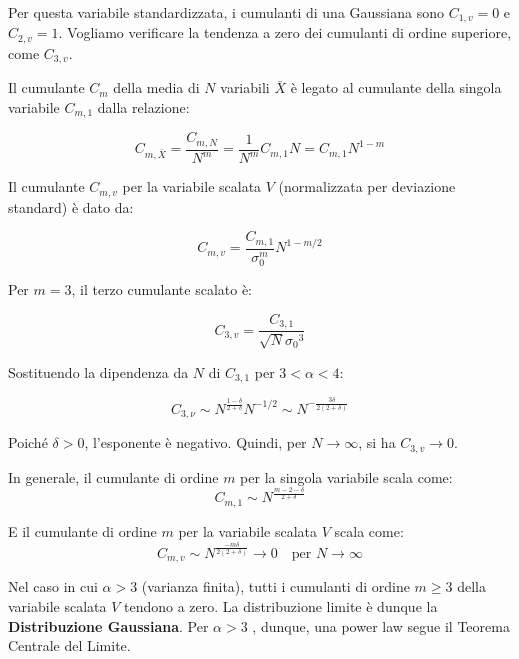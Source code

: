 Per questa variabile standardizzata, i cumulanti di una Gaussiana sono $C_{1,v}=0$ e $C_{2,v}=1$. Vogliamo verificare la tendenza a zero dei cumulanti di ordine superiore, come $C_{3,v}$.

Il cumulante $C_{m}$ della media di $N$ variabili $\bar{X}$ è legato al cumulante della singola variabile $C_{m,1}$ dalla relazione:

\begin{equation}
C_{m, \bar{X}} = \frac{C_{m,N}}{N^{m}} = \frac{1}{N^{m}} C_{m,1} N = C_{m,1} N^{1-m}
\end{equation}

Il cumulante $C_{m,v}$ per la variabile scalata $V$ (normalizzata per deviazione standard) è dato da:

\begin{equation}
C_{m, v}=\frac{C_{m, 1}}{\sigma_{0}^{m}}N^{1-m/2}
\end{equation}

Per $m=3$, il terzo cumulante scalato è:

\begin{equation}
C_{3,v}=\frac{C_{3,1}}{\sqrt{N}{\sigma_{0}}^{3}}
\end{equation}

Sostituendo la dipendenza da $N$ di $C_{3,1}$ per $3 < \alpha < 4$:

\begin{equation}
C_{3,\nu}\sim N^{\frac{1-\delta}{2+\delta}}N^{-1/2}\sim N^{-\frac{3\delta}{2(2+\delta)}}
\end{equation}

Poiché $\delta > 0$, l'esponente è negativo. Quindi, per $N \rightarrow \infty$, si ha $C_{3,v} \rightarrow 0$.

In generale, il cumulante di ordine $m$ per la singola variabile scala come:
\begin{equation}
C_{m,1}\sim N^{\frac{m-2-\delta}{2+\delta}}
\end{equation}

E il cumulante di ordine $m$ per la variabile scalata $V$ scala come:
\begin{equation}
C_{m, v}\sim N^{\frac{-m\delta}{2(2+\delta)}} \rightarrow 0 \quad \text{per } N\rightarrow\infty
\end{equation}

Nel caso in cui $\alpha > 3$ (varianza finita), tutti i cumulanti di ordine $m \ge 3$ della variabile scalata $V$ tendono a zero. La distribuzione limite è dunque la \textbf{Distribuzione Gaussiana}. Per $\alpha > 3$ , dunque, una power law segue il Teorema Centrale del Limite.

